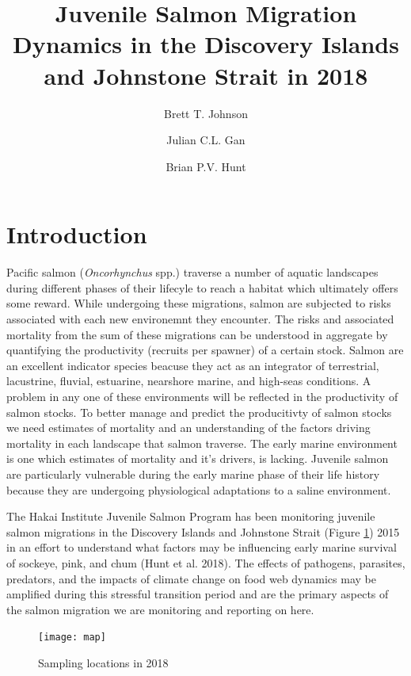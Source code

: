 \documentclass[fleqn,10pt,lineno]{wlpeerj} %
\title{Juvenile Salmon Migration Dynamics in the Discovery Islands and
Johnstone Strait in 2018}
\author[1]{Brett T. Johnson}
\author[]{Julian C.L. Gan}
\author[2, 3]{Brian P.V. Hunt}
\affil[1]{Hakai Institute Quadra Island Ecological Observatory, Heriot Bay, BC
V0P1H0}
\affil[2]{UBC EOS, IOF}
\theoremstyle{definition}
\theoremstyle{definition}
\theoremstyle{definition}
\theoremstyle{remark}
\begin{document}
\flushbottom
\maketitle
\thispagestyle{empty}

\section*{Introduction}\label{introduction}

Pacific salmon (\emph{Oncorhynchus} spp.) traverse a number of aquatic
landscapes during different phases of their lifecyle to reach a habitat
which ultimately offers some reward. While undergoing these migrations,
salmon are subjected to risks associated with each new environemnt they
encounter. The risks and associated mortality from the sum of these
migrations can be understood in aggregate by quantifying the
productivity (recruits per spawner) of a certain stock. Salmon are an
excellent indicator species beacuse they act as an integrator of
terrestrial, lacustrine, fluvial, estuarine, nearshore marine, and
high-seas conditions. A problem in any one of these environments will be
reflected in the productivity of salmon stocks. To better manage and
predict the producitivty of salmon stocks we need estimates of mortality
and an understanding of the factors driving mortality in each landscape
that salmon traverse. The early marine environment is one which
estimates of mortality and it's drivers, is lacking. Juvenile salmon are
particularly vulnerable during the early marine phase of their life
history because they are undergoing physiological adaptations to a
saline environment.

The Hakai Institute Juvenile Salmon Program has been monitoring juvenile
salmon migrations in the Discovery Islands and Johnstone Strait (Figure
\ref{fig:map}) 2015 in an effort to understand what factors may be
influencing early marine survival of sockeye, pink, and chum (Hunt et
al. 2018). The effects of pathogens, parasites, predators, and the
impacts of climate change on food web dynamics may be amplified during
this stressful transition period and are the primary aspects of the
salmon migration we are monitoring and reporting on here.

\begin{figure}

\texttt{[image: map]} \hfill{}

\caption{Sampling locations in 2018}\label{fig:map}
\end{figure}
\end{document}
